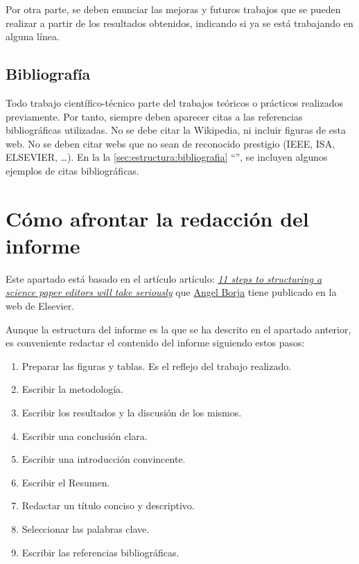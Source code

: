 \documentclass[11pt]{article}
\begin{document}
Por otra parte, se deben enunciar las mejoras y futuros trabajos que se pueden realizar a partir de los resultados obtenidos, indicando si ya se está trabajando en alguna línea.

\subsection{Bibliografía}
\label{sec:estructura:bibliografia}

Todo trabajo científico-técnico parte del trabajos teóricos o prácticos realizados previamente. Por tanto, siempre deben aparecer citas a las referencias bibliográficas utilizadas. No se debe citar la Wikipedia, ni incluir figuras de esta web. No se deben citar webs que no sean de reconocido prestigio (IEEE, ISA, ELSEVIER, …). En la la \autoref{sec:estructura:bibliografia} ``'', se incluyen algunos ejemplos de citas bibliográficas.



\section{Cómo afrontar la redacción del informe}
\label{sec:redaccion}

Este apartado está basado en el artículo artículo: \href{https://www.elsevier.com/connect/11-steps-to-structuring-a-science-paper-editors-will-take-seriously}{\itshape 11 steps to structuring a science paper editors will take seriously} que \href{https://www.linkedin.com/in/angel-borja-yerro-1320b76a/?originalSubdomain=es}{Angel Borja} tiene publicado en la web de Elsevier.

Aunque la estructura del informe es la que se ha descrito en el apartado anterior, es conveniente redactar el contenido del informe siguiendo estos pasos:

\begin{enumerate} \itemsep = 0ex %
    \item Preparar las figuras y tablas. Es el reflejo del trabajo realizado.
    \item Escribir la metodología.
    \item Escribir los resultados y la discusión de los mismos.
    \item Escribir una conclusión clara.
    \item Escribir una introducción convincente.
    \item Escribir el Resumen.
    \item Redactar un título conciso y descriptivo.
    \item Seleccionar las palabras clave.
    \item Escribir las referencias bibliográficas.
\end{enumerate}
\end{document}
